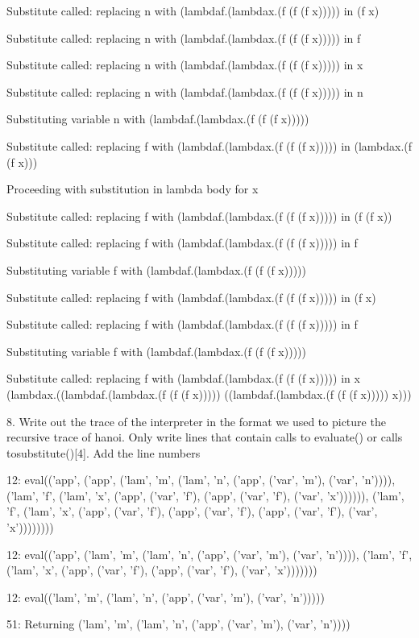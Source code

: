 \documentclass{article}
\theoremstyle{theorem}
\theoremstyle{definition}
\theoremstyle{remark}
\begin{document}
Substitute called: replacing n with (lambdaf.(lambdax.(f (f (f x))))) in (f x)

Substitute called: replacing n with (lambdaf.(lambdax.(f (f (f x))))) in f

Substitute called: replacing n with (lambdaf.(lambdax.(f (f (f x))))) in x

Substitute called: replacing n with (lambdaf.(lambdax.(f (f (f x))))) in n

Substituting variable n with (lambdaf.(lambdax.(f (f (f x)))))

Substitute called: replacing f with (lambdaf.(lambdax.(f (f (f x))))) in (lambdax.(f (f x)))

Proceeding with substitution in lambda body for x

Substitute called: replacing f with (lambdaf.(lambdax.(f (f (f x))))) in (f (f x))

Substitute called: replacing f with (lambdaf.(lambdax.(f (f (f x))))) in f

Substituting variable f with (lambdaf.(lambdax.(f (f (f x)))))

Substitute called: replacing f with (lambdaf.(lambdax.(f (f (f x))))) in (f x)

Substitute called: replacing f with (lambdaf.(lambdax.(f (f (f x))))) in f

Substituting variable f with (lambdaf.(lambdax.(f (f (f x)))))

Substitute called: replacing f with (lambdaf.(lambdax.(f (f (f x))))) in x
(lambdax.((lambdaf.(lambdax.(f (f (f x))))) ((lambdaf.(lambdax.(f (f (f x))))) x)))

8. Write out the trace of the interpreter in the format we used to picture the recursive trace of hanoi. Only write lines that contain calls to evaluate() or calls tosubstitute()[4]. Add the line numbers

12: eval(('app', ('app', ('lam', 'm', ('lam', 'n', ('app', ('var', 'm'), ('var', 'n')))), ('lam', 'f', ('lam', 'x', ('app', ('var', 'f'), ('app', ('var', 'f'), ('var', 'x')))))), ('lam', 'f', ('lam', 'x', ('app', ('var', 'f'), ('app', ('var', 'f'), ('app', ('var', 'f'), ('var', 'x'))))))))

12: eval(('app', ('lam', 'm', ('lam', 'n', ('app', ('var', 'm'), ('var', 'n')))), ('lam', 'f', ('lam', 'x', ('app', ('var', 'f'), ('app', ('var', 'f'), ('var', 'x')))))))

12: eval(('lam', 'm', ('lam', 'n', ('app', ('var', 'm'), ('var', 'n')))))

51: Returning ('lam', 'm', ('lam', 'n', ('app', ('var', 'm'), ('var', 'n'))))
\end{document}
